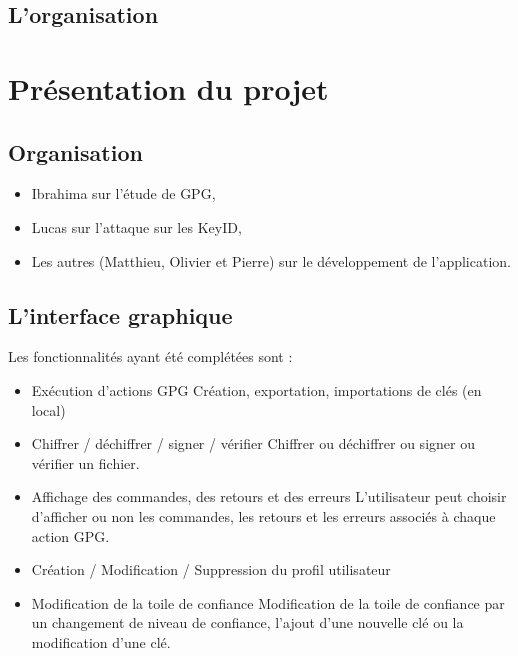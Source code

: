 \documentclass{../res/univ-projet}
\begin{document}
  \subsection{L'organisation}
    

\section{Présentation du projet}
    \subsection{Organisation}
    
    
    \begin{itemize}
      \item Ibrahima sur l'étude de GPG,
      \item Lucas sur l'attaque sur les KeyID,
      \item Les autres (Matthieu, Olivier et Pierre) sur le développement de l'application.
    \end{itemize}

  
  \subsection{L'interface graphique}
  
    Les fonctionnalités ayant été complétées sont :\medbreak
  \begin{itemize}
  
  \item Exécution d'actions GPG \smallbreak
  Création, exportation, importations de clés (en local)\smallbreak
  \item Chiffrer / déchiffrer / signer / vérifier \smallbreak
  Chiffrer ou déchiffrer ou signer ou vérifier un fichier. \smallbreak
  \item Affichage des commandes, des retours et des erreurs \smallbreak
  L'utilisateur peut choisir d'afficher ou non les commandes, les retours et les erreurs associés à chaque action GPG. \smallbreak 
  \item Création / Modification / Suppression du profil utilisateur \smallbreak
  \item Modification de la toile de confiance \smallbreak
  Modification de la toile de confiance par un changement de niveau de confiance, l'ajout d'une nouvelle clé ou la modification d'une clé.   
  \end{itemize}
 
\end{document}
